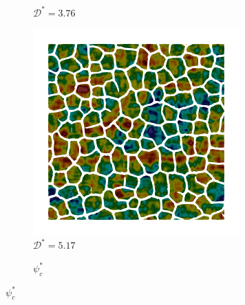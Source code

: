 \begin{figure}[!htbp]
\begin{subfigure}[b]{0.25\textwidth}
    \caption{$\mathcal{D}^* = 3.76$}
    \label{fig: Chapter4/2D/psic_exp_cartesian_5_5_rho_0_seed_a_with_crack_160}
  \end{subfigure}
  \begin{subfigure}[b]{0.25\textwidth}
    \includegraphics[width=\textwidth]{Chapter4/figures/2D/psic_exp_cartesian_5_5_rho_0_seed_b_with_crack_220.png}
    \caption{$\mathcal{D}^* = 5.17$}
    \label{fig: Chapter4/2D/psic_exp_cartesian_5_5_rho_0_seed_a_with_crack_220}
  \end{subfigure}
  \begin{subfigure}[b]{0.08\textwidth}
    \caption*{$\psi_c^*$}

\end{subfigure}
\end{figure}
